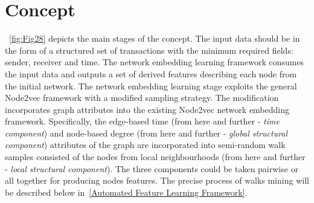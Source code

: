 \section{Concept}
\label{Concept}
~\autoref{fig:Fig28} depicts the main stages of the concept. The input data should be in the form of a structured set of transactions with the minimum required fields: sender, receiver and time. The network embedding learning framework consumes the input data and outputs a set of derived features describing each node from the initial network. The network embedding learning stage exploits the general Node2vec framework with a modified sampling strategy. The modification incorporates graph attributes into the existing Node2vec network embedding framework. Specifically, the edge-based time (from here and further - \textit{time component}) and node-based degree (from here and further - \textit{global structural component}) attributes of the graph are incorporated into semi-random walk samples consisted of the nodes from local neighbourhoods (from here and further - \textit{local structural component}). The three components could be taken pairwise or all together for producing nodes features. The precise process of walks mining will be described below in~\ref{Automated Feature Learning Framework}. 

